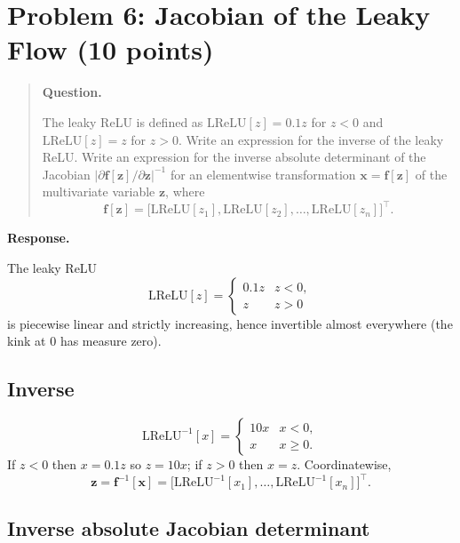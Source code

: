\documentclass[11pt]{article}
\newenvironment{question}{%
  \par\addvspace{0.8em}%
  \begin{quote}\small
  \noindent\textbf{Question.}\enspace\ignorespaces
}{%
  \end{quote}%
  \par\nopagebreak
  \noindent\textbf{Response.}\par\nopagebreak\smallskip
}
\begin{document}
\section{Problem 6: Jacobian of the Leaky Flow (10 points)}

\begin{question}
The leaky ReLU is defined as \(\mathrm{LReLU}[z]=0.1z\) for \(z<0\) and \(\mathrm{LReLU}[z]=z\) for \(z>0\). Write an expression for the inverse of the leaky ReLU. Write an expression for the inverse absolute determinant of the Jacobian \(\bigl|\partial\mathbf{f}[\mathbf{z}]/\partial\mathbf{z}\bigr|^{-1}\) for an elementwise transformation \(\mathbf{x}=\mathbf{f}[\mathbf{z}]\) of the multivariate variable \(\mathbf{z}\), where
\[
  \mathbf{f}[\mathbf{z}]
  =\bigl[\mathrm{LReLU}[z_1],\mathrm{LReLU}[z_2],\ldots,\mathrm{LReLU}[z_n]\bigr]^\top.
\]
\end{question}

The leaky ReLU
\[
  \mathrm{LReLU}[z]
  =
  \begin{cases}
    0.1z & z<0,\\
    z    & z>0
  \end{cases}
\]
is piecewise linear and strictly increasing, hence invertible almost
everywhere (the kink at \(0\) has measure zero).

\subsection{Inverse}

\[
  \mathrm{LReLU}^{-1}[x]
  =
  \begin{cases}
    10x & x<0,\\
    x   & x\ge 0.
  \end{cases}
\]
If \(z<0\) then \(x=0.1z\) so \(z=10x\); if \(z>0\) then \(x=z\).
Coordinatewise,
\[
  \mathbf{z}
  =\mathbf{f}^{-1}[\mathbf{x}]
  =\bigl[\mathrm{LReLU}^{-1}[x_1],\ldots,\mathrm{LReLU}^{-1}[x_n]\bigr]^\top.
\]

\subsection{Inverse absolute Jacobian determinant}
\end{document}
